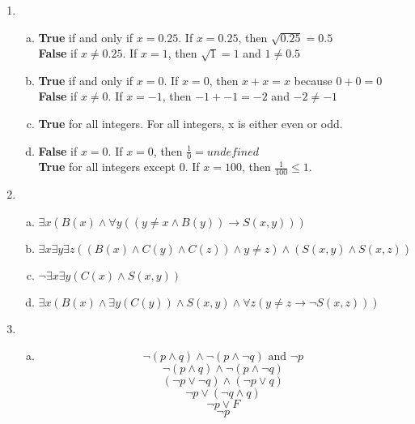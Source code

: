 \documentclass[14pt]{extarticle} %
\begin{document}
\begin{enumerate}
    \item
    \begin{enumerate}[a.]
        \item \textbf{True} if and only if $x = 0.25$. If $x = 0.25$, then $\sqrt{0.25} = 0.5$ \\
        \textbf{False} if $x \neq 0.25$. If $x = 1$, then $\sqrt{1} = 1$ and $1 \neq 0.5$
        \item \textbf{True} if and only if $x = 0$. If $x = 0$, then $x + x = x$ because $0 + 0 = 0$ \\
        \textbf{False} if $x \neq 0$. If $x = -1$, then $-1 + -1 = -2$ and $-2 \neq -1$
        \item \textbf{True} for all integers. For all integers, x is either even or odd.
        \item \textbf{False} if $x = 0$. If $x = 0$, then $\frac{1}{0} = undefined$ \\
        \textbf{True} for all integers except 0. If $x = 100$, then $\frac{1}{100} \leq 1$. 
    \end{enumerate}
    
    \item
    \begin{enumerate}[a.]
        \item $\exists x(B(x) \land \forall y((y \neq x \land B(y)) \rightarrow S(x, y)))$ 
        \item $\exists x \exists y \exists z ((B(x) \land C(y) \land C(z)) \land y \neq z) \land (S(x, y) \land S(x, z))$
        \item $\neg \exists x \exists y (C(x) \land S(x, y))$
        \item $\exists x (B(x) \land \exists y (C(y)) \land S(x, y) \land \forall z(y \neq z \rightarrow \neg S(x, z)))$ \\
    \end{enumerate}

    \item
    \begin{enumerate}[a.]
        \item 
        \[\neg (p \land q) \land \neg(p \land \neg q) \text{ and } \neg p\] 
        \[\neg (p \land q) \land \neg(p \land \neg q)\]
        \[(\neg p \lor \neg q) \land (\neg p \lor q)\] 
        \[\neg p \lor (\neg q \land q) \]
        \[\neg p \lor F\]
        \[\neg p\]
        

\end{enumerate}
\end{enumerate}
\end{document}
